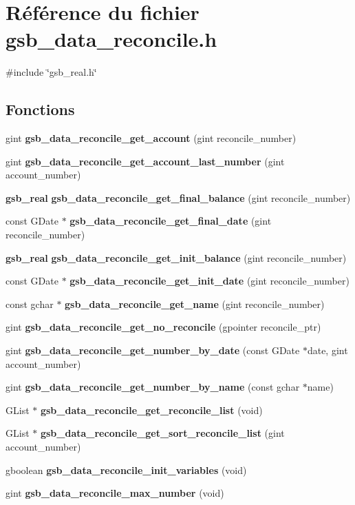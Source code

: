 \section{Référence du fichier gsb\_\-data\_\-reconcile.h}
\label{gsb__data__reconcile_8h}
{\ttfamily \#include \char`\"{}gsb\_\-real.h\char`\"{}}\par
\subsection*{Fonctions}
\begin{DoxyCompactItemize}
\item 
gint {\bf gsb\_\-data\_\-reconcile\_\-get\_\-account} (gint reconcile\_\-number)
\item 
gint {\bf gsb\_\-data\_\-reconcile\_\-get\_\-account\_\-last\_\-number} (gint account\_\-number)
\item 
{\bf gsb\_\-real} {\bf gsb\_\-data\_\-reconcile\_\-get\_\-final\_\-balance} (gint reconcile\_\-number)
\item 
const GDate $\ast$ {\bf gsb\_\-data\_\-reconcile\_\-get\_\-final\_\-date} (gint reconcile\_\-number)
\item 
{\bf gsb\_\-real} {\bf gsb\_\-data\_\-reconcile\_\-get\_\-init\_\-balance} (gint reconcile\_\-number)
\item 
const GDate $\ast$ {\bf gsb\_\-data\_\-reconcile\_\-get\_\-init\_\-date} (gint reconcile\_\-number)
\item 
const gchar $\ast$ {\bf gsb\_\-data\_\-reconcile\_\-get\_\-name} (gint reconcile\_\-number)
\item 
gint {\bf gsb\_\-data\_\-reconcile\_\-get\_\-no\_\-reconcile} (gpointer reconcile\_\-ptr)
\item 
gint {\bf gsb\_\-data\_\-reconcile\_\-get\_\-number\_\-by\_\-date} (const GDate $\ast$date, gint account\_\-number)
\item 
gint {\bf gsb\_\-data\_\-reconcile\_\-get\_\-number\_\-by\_\-name} (const gchar $\ast$name)
\item 
GList $\ast$ {\bf gsb\_\-data\_\-reconcile\_\-get\_\-reconcile\_\-list} (void)
\item 
GList $\ast$ {\bf gsb\_\-data\_\-reconcile\_\-get\_\-sort\_\-reconcile\_\-list} (gint account\_\-number)
\item 
gboolean {\bf gsb\_\-data\_\-reconcile\_\-init\_\-variables} (void)
\item 
gint {\bf gsb\_\-data\_\-reconcile\_\-max\_\-number} (void)

\end{DoxyCompactItemize}
